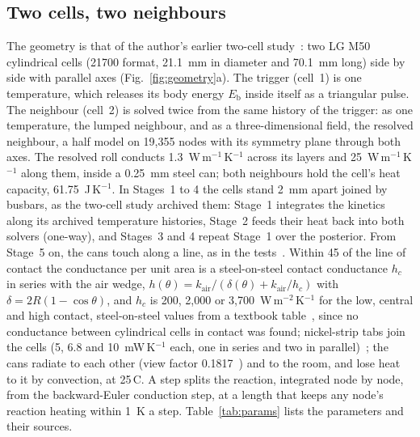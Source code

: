 \documentclass[preprint,12pt]{elsarticle}
\newcommand{\degC}{\,\textdegree C}
\newcommand{\Eb}{E_{\mathrm{b}}}
\newcommand{\PH}[1]{\textcolor{red}{[#1]}}
\begin{document}
\subsection{Two cells, two neighbours}
\label{sec:geometry}

The geometry is that of the author's earlier two-cell study~\cite{satte2026twocell}: two LG M50 cylindrical cells (21700 format, 21.1~mm in diameter and 70.1~mm long) side by side with parallel axes (Fig.~\ref{fig:geometry}a). The trigger (cell~1) is one temperature, which releases its body energy $\Eb$ inside itself as a triangular pulse. The neighbour (cell~2) is solved twice from the same history of the trigger: as one temperature, the lumped neighbour, and as a three-dimensional field, the resolved neighbour, a half model on 19,355 nodes with its symmetry plane through both axes. The resolved roll conducts 1.3~W\,m$^{-1}$\,K$^{-1}$ across its layers and 25~W\,m$^{-1}$\,K$^{-1}$ along them, inside a 0.25~mm steel can; both neighbours hold the cell's heat capacity, 61.75~J\,K$^{-1}$. In Stages~1 to 4 the cells stand 2~mm apart joined by busbars, as the two-cell study archived them: Stage~1 integrates the kinetics along its archived temperature histories, Stage~2 feeds their heat back into both solvers (one-way), and Stages~3 and 4 repeat Stage~1 over the posterior. From Stage~5 on, the cans touch along a line, as in the tests~\cite{fransson2024exploring}. Within 45\textdegree{} of the line of contact the conductance per unit area is a steel-on-steel contact conductance $h_c$ in series with the air wedge, $h(\theta)=k_{\mathrm{air}}/(\delta(\theta)+k_{\mathrm{air}}/h_c)$ with $\delta=2R(1-\cos\theta)$, and $h_c$ is 200, 2,000 or 3,700~W\,m$^{-2}$\,K$^{-1}$ for the low, central and high contact, steel-on-steel values from a textbook table~\cite[Table~2.1]{lienhard2024heat}, since no conductance between cylindrical cells in contact was found; nickel-strip tabs join the cells (5, 6.8 and 10~mW\,K$^{-1}$ each, one in series and two in parallel)~\cite{satte2026twocell}; the cans radiate to each other (view factor 0.1817~\cite{bergman2011fundamentals}) and to the room, and lose heat to it by convection, at 25\degC. A step splits the reaction, integrated node by node, from the backward-Euler conduction step, at a length that keeps any node's reaction heating within 1~K a step. Table~\ref{tab:params} lists the parameters and their sources.

\IfFileExists{tables/t2_parameters.tex}{}{\PH{table pending}}
\end{document}
